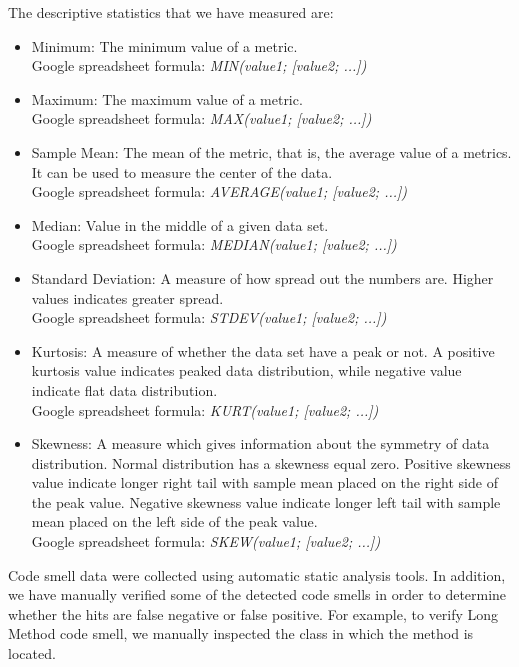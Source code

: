 The descriptive statistics that we have measured are:
\begin{itemize}
	\item Minimum: The minimum value of a metric. \\ Google spreadsheet formula: \textit{MIN(value1; [value2; ...])}
	\item Maximum: The maximum value of a metric. \\ Google spreadsheet formula: \textit{MAX(value1; [value2; ...])}
	\item Sample Mean: The mean of the metric, that is, the average value of a metrics. It can be used to measure the center of the data. \\ Google spreadsheet formula: \textit{AVERAGE(value1; [value2; ...])}
	\item Median: Value in the middle of a given data set. \\ Google spreadsheet formula: \textit{MEDIAN(value1; [value2; ...])}
	\item Standard Deviation: A measure of how spread out the numbers are. Higher values indicates greater spread. \\ Google spreadsheet formula: \textit{STDEV(value1; [value2; ...])}
	\item Kurtosis: A measure of whether the data set have a peak or not. A positive kurtosis value indicates peaked data distribution, while negative value indicate flat data distribution. \\ Google spreadsheet formula: \textit{KURT(value1; [value2; ...])}
	\item Skewness: A measure which gives information about the symmetry of data distribution. Normal distribution has a skewness equal zero. Positive skewness value indicate longer right tail with sample mean placed on the right side of the peak value. Negative skewness value indicate longer left tail with sample mean placed on the left side of the peak value. \\ Google spreadsheet formula: \textit{SKEW(value1; [value2; ...])}
\end{itemize}

Code smell data were collected using automatic static analysis tools. In addition, we have manually verified some of the detected code smells in order to determine whether the hits are false negative or false positive. For example, to verify Long Method code smell, we manually inspected the class in which the method is located. 

